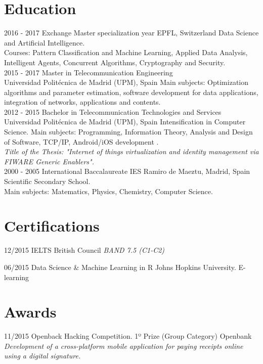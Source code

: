 \documentclass[]{friggeri-cv}
\begin{document}
\section{Education}
\begin{entrylist}
  \entry
    {2016 - 2017}
    {Exchange Master specialization year}
    {EPFL, Switzerland}
    {Data Science and Artificial Intelligence.\\
    Courses: Pattern Classification and Machine Learning, Applied Data Analysis, Intelligent Agents, Concurrent Algorithms, Cryptography and Security.\\}
    \entry
    {2015 - 2017}
    {Master in Telecommunication Engineering\\}
    {Universidad Politécnica de Madrid (UPM), Spain}
    {Main subjects: Optimization algorithms and parameter estimation, software development for data applications, integration of networks, applications and contents.\\}
  \entry
    {2012 - 2015}
    {Bachelor in Telecommunication Technologies and Services\\}
    {Universidad Politécnica de Madrid (UPM), Spain}
    {Intensification in Computer Science. Main subjects: Programming, Information Theory, Analysis and Design of Software, TCP/IP, Android/iOS development
    .\\
    \emph{Title of the Thesis: "Internet of things virtualization and identity management via FIWARE Generic Enablers".}\\}
  \entry
    {2000 - 2005}
    {International Baccalaureate}
    {IES Ramiro de Maeztu, Madrid, Spain}
    {Scientific Secondary School.\\
    Main subjects: Matematics, Physics, Chemistry, Computer Science.}
\end{entrylist}

\section{Certifications}

\begin{entrylist}
    \entry
    {12/2015}
    {IELTS}
    {British Council}
    {\emph{BAND 7.5 (C1-C2)}}
    
    \entry
    {06/2015}
    {Data Science \& Machine Learning in R}
    {Johns Hopkins University. E-learning}
    
\end{entrylist}
\section{Awards}
\begin{entrylist}
\entry
    {11/2015}
    {Openback Hacking Competition. 1º Prize (Group Category)}
    {Openbank}
    {\emph{Development of a cross-platform mobile application for paying receipts online using a digital signature.}}
\end{entrylist}
\end{document}
